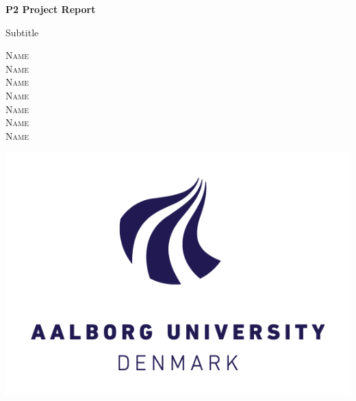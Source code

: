 \begin{titlepage}
\begin{center}
    \vspace*{10mm}
    \Huge
    \textbf{P2 Project Report}\\
    \vspace{0.4cm}
    
    \LARGE
    Subtitle
    \vspace{1.5cm}
    
    \textsc{Name}\\
    \textsc{Name}\\
    \textsc{Name}\\
    \textsc{Name}\\
    \textsc{Name}\\
    \textsc{Name}\\
    \textsc{Name}\\
    
    \vspace{6cm}
    
    \includegraphics[scale = 2]{Images/AAU_LOGO_RGB_UK.png}
    
\end{center}

\thispagestyle{empty}
\end{titlepage}


\pagebreak